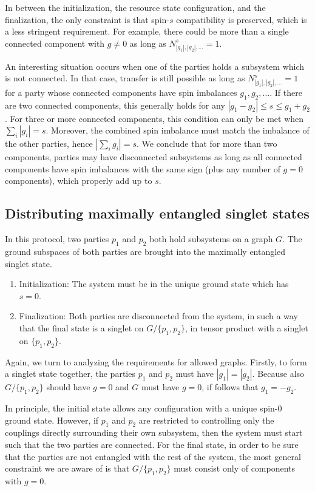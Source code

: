 In between the initialization, the resource state configuration, and the finalization, the only constraint is that spin-$s$ compatibility is preserved, which is a less stringent requirement. For example, there could be more than a single connected component with $g\neq 0$ as long as $N_{|g_1|, |g_2|, \ldots }^s = 1$.  

An interesting situation occurs when one of the parties holds a subsystem which is not connected. In that case,  transfer is still possible as long as $N_{|g_1|, |g_2|, \ldots }^s = 1$ for a party whose connected components have spin imbalances $g_1, g_2, \ldots$. If there are two connected components, this generally holds for any $|g_1 - g_2| \leq s \leq g_1 + g_2$. For three or more connected components, this condition can only be met when $\sum_i |g_i| = s$. Moreover, the combined spin imbalance must match the imbalance of the other parties, hence $|\sum_i g_i | = s$. We conclude that for more than two components, parties may have disconnected subsystems as long as all connected components have spin imbalances with the same sign (plus any number of $g=0$ components), which properly add up to $s$. 





\subsection{Distributing maximally entangled singlet states}
In this protocol, two parties $p_1$ and $p_2$ both hold subsystems on a graph $G$. The ground subspaces of both parties are brought into the maximally entangled singlet state. 

\begin{enumerate}
\item Initialization: The system must be in the unique ground state which has $s=0$. 
\item Finalization: Both parties are disconnected from the system, in such a way that the final state is a singlet on $G / \{p_1, p_2 \}$, in tensor product with a singlet on $\{p_1, p_2\}$. 
\end{enumerate}

Again, we turn to analyzing the requirements for allowed graphs. Firstly, to form a singlet state together, the parties $p_1$ and $p_2$ must have $|g_1| = |g_2|$. Because also  $G / \{p_1, p_2 \}$ should have $g=0$ and $G$ must have $g=0$, if follows that $g_1 = -g_2$. 

In principle, the initial state allows any configuration with a unique spin-$0$ ground state. However, if $p_1$ and $p_2$ are restricted to controlling only the couplings directly surrounding their own subsystem, then the system must start such that the two parties are connected. For the final state, in order to be sure that the parties are not entangled with the rest of the system, the most general constraint we are aware of is that $G / \{ p_1, p_2 \}$ must consist only of components with $g=0$. 

